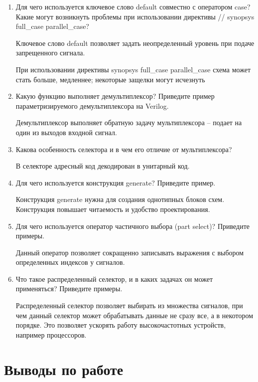 \documentclass[a4paper,14pt]{article}
\begin{document}
\begin{enumerate}
	\item Для чего используется ключевое слово default совместно с оператором case? Какие могут возникнуть проблемы при использовании директивы // synopsys full\_case parallel\_case?
	
	Ключевое слово default позволяет задать неопределенный уровень при подаче запрещенного сигнала.
	
	При использовании директивы synopsys full\_case parallel\_case схема может стать больше, медленнее;
	некоторые защелки могут исчезнуть
	
	\item Какую функцию выполняет демультиплексор? Приведите пример параметризируемого демультиплексора на Verilog.
	
	Демультиплексор выполняет обратную задачу мультиплексора -- подает на один из выходов входной сигнал.
	
	
	\item Какова особенность селектора и в чем его отличие от мультиплексора?
	
	В селекторе адресный код декодирован в унитарный код.
	
	\item Для чего используется конструкция generate? Приведите пример.
	
	Конструкция generate нужна для создания однотипных блоков схем.
	Конструкция повышает читаемость и удобство проектирования.
	
	\item Для чего используется оператор частичного выбора (part select)? Приведите примеры.
	
	Данный оператор позволяет сокращенно записывать выражения с выбором определенных индексов у сигналов.
	
	\item Что такое распределенный селектор, и в каких задачах он может применяться? Приведите примеры.
	
	Распределенный селектор позволяет выбирать из множества сигналов, при чем данный селектор может обрабатывать данные не сразу все, а в некотором порядке.
	Это позволяет ускорять работу высокочастотных устройств, например процессоров.
	
\end{enumerate}

\section{Выводы по работе}
\end{document}

